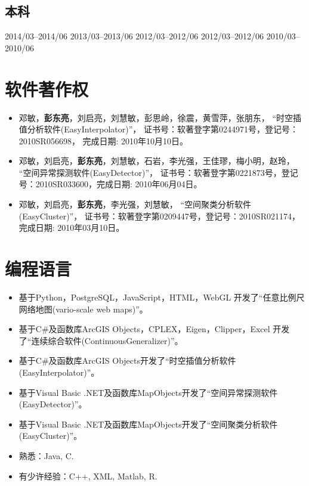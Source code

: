 \documentclass{resume}
\begin{document}
\subsection{本科}
\begin{itemize}[parsep=0ex]
    {2014/03--2014/06}
    {2013/03--2013/06}    
    {2012/03--2012/06}
    {2012/03--2012/06}    
    {2010/03--2010/06}    
\end{itemize}


\section{软件著作权}
\begin{itemize}[parsep=0ex]
\item 邓敏，\textbf{彭东亮}，刘启亮，刘慧敏，彭思岭，徐震，黄雪萍，张朋东，
    ``时空插值分析软件(EasyInterpolator)''，
   证书号：软著登字第0244971号，登记号：2010SR056698， 完成日期: 2010年10月10日。
\item 邓敏，刘启亮，\textbf{彭东亮}，刘慧敏，石岩，李光强，王佳璆，梅小明，赵玲，
   ``空间异常探测软件(EasyDetector)''，
   证书号：软著登字第0221873号，登记号：2010SR033600，完成日期: 2010年06月04日。
\item 邓敏，刘启亮，\textbf{彭东亮}，李光强，刘慧敏，
   ``空间聚类分析软件(EasyCluster)''，
   证书号：软著登字第0209447号，登记号：2010SR021174，完成日期: 2010年03月10日。   
\end{itemize}

\section{编程语言}
\begin{itemize}[parsep=0ex]
\item 基于Python，PostgreSQL，JavaScript，HTML，WebGL 
    开发了``任意比例尺网络地图(vario-scale web maps)''。\footnotemark%
\item 基于C\#及函数库ArcGIS Objects，CPLEX，Eigen，Clipper，Excel
    开发了``连续综合软件(ContinuousGeneralizer)''。\footnotemark
\item 基于C\#及函数库ArcGIS Objects开发了``时空插值分析软件(EasyInterpolator)''。
\item 基于Visual Basic .NET及函数库MapObjects开发了``空间异常探测软件(EasyDetector)''。
\item 基于Visual Basic .NET及函数库MapObjects开发了``空间聚类分析软件(EasyCluster)''。 
\item 熟悉：Java, C.
\item 有少许经验：C++, XML, Matlab, R.
\end{itemize}
\end{document}
